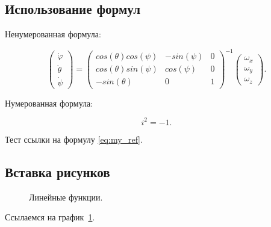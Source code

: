 \subsection{Использование формул}

Ненумерованная формула:

\begin{equation}
    \begin{pmatrix} \dot{\varphi}\\ \dot{\theta} \\ \dot{\psi} \end{pmatrix}
    = \begin{pmatrix}
        cos(\theta)cos(\psi) & -sin(\psi) & 0 \\
        cos(\theta)sin(\psi) & cos(\psi)  & 0 \\
        -sin(\theta)         & 0         &  1
    \end{pmatrix}^{-1}
    \begin{pmatrix} \omega_x\\ \omega_y \\ \omega_z \end{pmatrix}.
\end{equation}

Нумерованная формула:

\begin{equation}
    i^2 = -1.
    \label{eq:my_ref}
\end{equation}

Тест ссылки на формулу \ref{eq:my_ref}.

\subsection{Вставка рисунков}

\begin{figure}[ht]
\begin{center}

\caption{
\label{graph-fig}
     Линейные функции.}
\end {center}
\end {figure}
Ссылаемся на график~\ref{graph-fig}.

